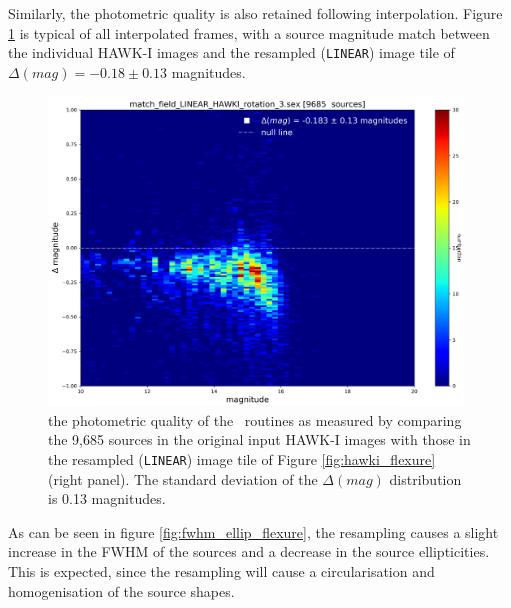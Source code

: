 Similarly, the photometric quality is also retained following interpolation.   Figure \ref{fig:mag_flexure} is typical of all interpolated frames, with a source magnitude match 
between the individual HAWK-I images and the resampled ({\tt LINEAR}) image tile of $\Delta(mag)=-0.18\pm0.13$ magnitudes.

\begin{figure}[H]
\centering
\includegraphics[width=11cm]{figures/match_field_LINEAR_HAWKI_rotation_3_mag_scatter_plot.png}
\caption[]
	{\footnotesize  the photometric quality of the \hdrlresample\ routines as measured by comparing the 9,685 sources in the original input HAWK-I images
	with those in the resampled ({\tt LINEAR}) image tile of Figure \ref{fig:hawki_flexure} (right panel).
	The standard deviation of the $\Delta(mag)$  distribution is 0.13 magnitudes. 	
	}
	\label{fig:mag_flexure}
\end{figure}

As can be seen in figure \ref{fig:fwhm_ellip_flexure}, the resampling causes a slight increase in the FWHM of the sources and a decrease in the source ellipticities.
This is expected, since the resampling will cause a circularisation and homogenisation of the source shapes.


